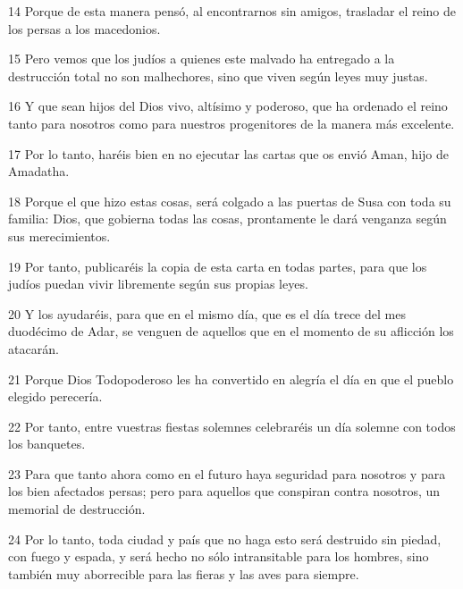 \par 14 Porque de esta manera pensó, al encontrarnos sin amigos, trasladar el reino de los persas a los macedonios.
\par 15 Pero vemos que los judíos a quienes este malvado ha entregado a la destrucción total no son malhechores, sino que viven según leyes muy justas.
\par 16 Y que sean hijos del Dios vivo, altísimo y poderoso, que ha ordenado el reino tanto para nosotros como para nuestros progenitores de la manera más excelente.
\par 17 Por lo tanto, haréis bien en no ejecutar las cartas que os envió Aman, hijo de Amadatha.
\par 18 Porque el que hizo estas cosas, será colgado a las puertas de Susa con toda su familia: Dios, que gobierna todas las cosas, prontamente le dará venganza según sus merecimientos.
\par 19 Por tanto, publicaréis la copia de esta carta en todas partes, para que los judíos puedan vivir libremente según sus propias leyes.
\par 20 Y los ayudaréis, para que en el mismo día, que es el día trece del mes duodécimo de Adar, se venguen de aquellos que en el momento de su aflicción los atacarán.
\par 21 Porque Dios Todopoderoso les ha convertido en alegría el día en que el pueblo elegido perecería.
\par 22 Por tanto, entre vuestras fiestas solemnes celebraréis un día solemne con todos los banquetes.
\par 23 Para que tanto ahora como en el futuro haya seguridad para nosotros y para los bien afectados persas; pero para aquellos que conspiran contra nosotros, un memorial de destrucción.
\par 24 Por lo tanto, toda ciudad y país que no haga esto será destruido sin piedad, con fuego y espada, y será hecho no sólo intransitable para los hombres, sino también muy aborrecible para las fieras y las aves para siempre.

